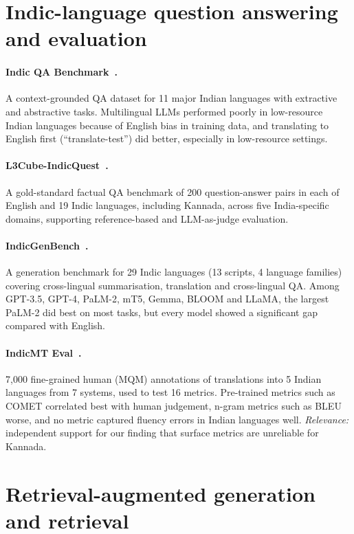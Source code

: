 \section{Indic-language question answering and evaluation}

\paragraph{Indic QA Benchmark~\cite{singh2024indicqa}.}
A context-grounded QA dataset for 11 major Indian languages with extractive and abstractive
tasks. Multilingual LLMs performed poorly in low-resource Indian languages because of English
bias in training data, and translating to English first (``translate-test'') did better,
especially in low-resource settings.

\paragraph{L3Cube-IndicQuest~\cite{rohera2024indicquest}.}
A gold-standard factual QA benchmark of 200 question-answer pairs in each of English and 19
Indic languages, including Kannada, across five India-specific domains, supporting
reference-based and LLM-as-judge evaluation.

\paragraph{IndicGenBench~\cite{singh2024indicgenbench}.}
A generation benchmark for 29 Indic languages (13 scripts, 4 language families) covering
cross-lingual summarisation, translation and cross-lingual QA. Among GPT-3.5, GPT-4, PaLM-2,
mT5, Gemma, BLOOM and LLaMA, the largest PaLM-2 did best on most tasks, but every model showed
a significant gap compared with English.

\paragraph{IndicMT Eval~\cite{sai2023indicmteval}.}
7,000 fine-grained human (MQM) annotations of translations into 5 Indian languages from 7
systems, used to test 16 metrics. Pre-trained metrics such as COMET correlated best with
human judgement, n-gram metrics such as BLEU worse, and no metric captured fluency errors in
Indian languages well. \emph{Relevance:} independent support for our finding that surface
metrics are unreliable for Kannada.

\section{Retrieval-augmented generation and retrieval}

